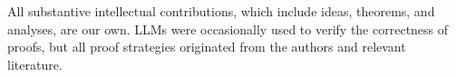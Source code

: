 \documentclass{article}
\begin{document}
All substantive intellectual contributions, which include ideas, theorems, and analyses, are our own. LLMs were occasionally used to verify the correctness of proofs, but all proof strategies originated from the authors and relevant literature.






\end{document}
